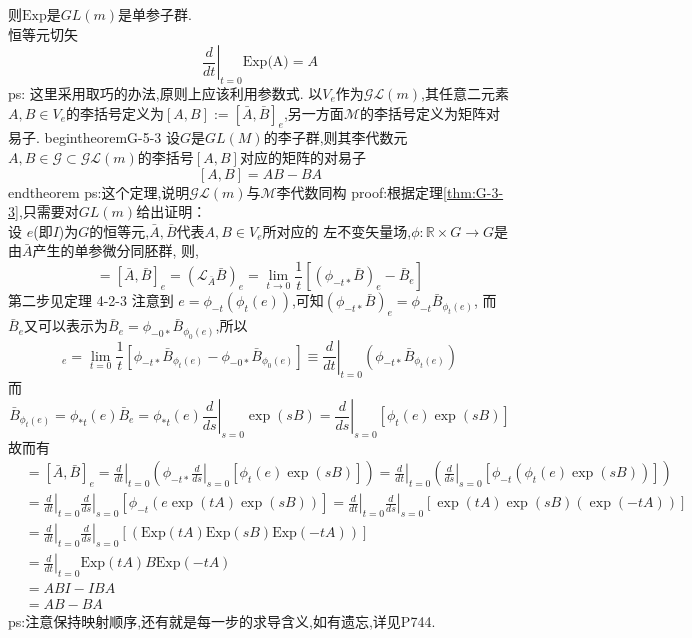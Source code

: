 \documentclass[../main.tex]{subfiles}
\begin{document}
    则$\text{Exp}$是$GL(m)$是单参子群.\\
    恒等元切矢
    \begin{equation*}
        \left.\frac{d}{dt}\right|_{t=0}\text{Exp(A)}= A
    \end{equation*}
    ps: 这里采用取巧的办法,原则上应该利用参数式.
    以$V_e$作为$\mathscr{GL}(m)$,其任意二元素$A,B \in V_e$的李括号定义为$[A,B]:=[\bar{A},\bar{B}]_e$,另一方面$\mathscr{M}$的李括号定义为矩阵对易子.
begin{theorem}{}{G-5-3}	设$G$是$GL(M)$的李子群,则其李代数元$A,B \in \mathscr{G} \subset \mathscr{GL}(m)$的李括号$[A,B]$对应的矩阵的对易子	$$ [A,B]=AB - BA $$
end{theorem}
ps:这个定理,说明$\mathscr{GL}(m)$与$\mathscr{M}$李代数同构
proof:根据定理\ref{thm:G-3-3},只需要对$GL(m)$给出证明：\\
设 $e$(即$I$)为$G$的恒等元,$\bar{A},\bar{B}$代表$A,B\in V_e$所对应的
左不变矢量场,$\phi:\mathbb{R}\times G \rightarrow G$是由$\bar{A}$产生的单参微分同胚群,
则,
\begin{equation*}
[A,B] = [\bar{A},\bar{B}]_e = (\mathscr{L}_{\bar{A}}\bar{B})_e = \lim_{t\rightarrow 0}\frac{1}{t}[(\phi_{-t*}\bar{B})_e-\bar{B}_e]
\end{equation*}
第二步见定理 4-2-3
注意到 $e = \phi_{-t}(\phi_t (e))$,可知$(\phi_{-t*}\bar{B})_e = \phi_{-t}\bar{B}_{\phi_{t}(e)}$,
而$\bar{B}_e$又可以表示为$\bar{B}_e=\phi_{-0*}\bar{B}_{\phi_0(e)}$,所以
\begin{equation*}
    [\bar{A},\bar{B}]_e = \lim_{t=0}\frac{1}{t}[\phi_{-t*}\bar{B}_{\phi_{t}(e)}-\phi_{-0*}\bar{B}_{\phi_0(e)}]\equiv \left.\frac{d}{dt}\right|_{t=0}(\phi_{-t*}\bar{B}_{\phi_{t}(e)}) 
\end{equation*}
而\begin{equation*}
    \bar{B}_{\phi_{t}(e)} = \phi_{*t}(e)\bar{B}_e = \phi_{*t}(e)\left.\frac{d}{ds}\right|_{s = 0}\exp(sB) = \left.\frac{d}{ds}\right|_{s = 0}[\phi_{t}(e)\exp(sB)]
\end{equation*}
故而有 \begin{align*}
    [A,B]& =[\bar{A},\bar{B}]_e = \left.\frac{d}{dt}\right|_{t=0}\left( \phi_{-t*} \left.\frac{d}{ds}\right|_{s = 0}[\phi_{t}(e)\exp(sB)]\right)
    =\left.\frac{d}{dt}\right|_{t=0}\left(  \left.\frac{d}{ds}\right|_{s = 0}[\phi_{-t}(\phi_{t}(e)\exp(sB))]\right)\\
    &=\left.\frac{d}{dt}\right|_{t=0} \left.\frac{d}{ds}\right|_{s = 0}[\phi_{-t}(e\exp(tA)\exp(sB))]
    =\left.\frac{d}{dt}\right|_{t=0} \left.\frac{d}{ds}\right|_{s = 0}[\exp(tA)\exp(sB)(\exp(-tA))]\\
    &=\left.\frac{d}{dt}\right|_{t=0} \left.\frac{d}{ds}\right|_{s = 0}[(\text{Exp}(tA)\text{Exp}(sB)\text{Exp}(-tA))]\\
    &=\left.\frac{d}{dt}\right|_{t=0}\text{Exp}(tA)B\text{Exp}(-tA)\\
    &= ABI - IBA\\
    &=AB - BA
\end{align*}
ps:注意保持映射顺序,还有就是每一步的求导含义,如有遗忘,详见P744.
\end{document}
